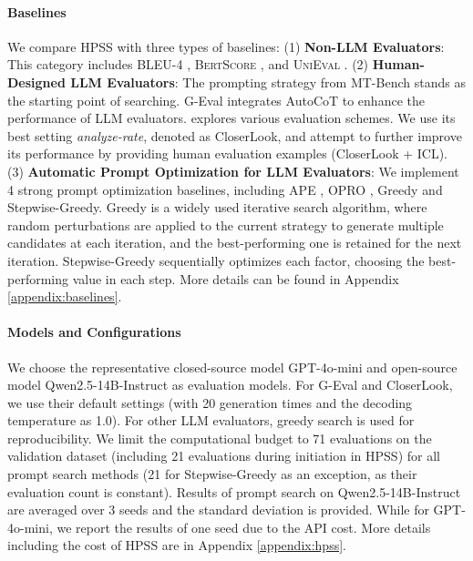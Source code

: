 \paragraph{Baselines}
We compare HPSS with three types of baselines: 
(1) \textbf{Non-LLM Evaluators}: This category includes BLEU-4 \cite{papineni-etal-2002-bleu}, \textsc{BertScore} \cite{bert-score}, 
and \textsc{UniEval} \cite{zhong-etal-2022-towards}.
(2) \textbf{Human-Designed LLM Evaluators}: 
The prompting strategy from MT-Bench \cite{zheng2023judging} 
stands as the starting point of searching.
G-Eval \cite{liu-etal-2023-g} integrates AutoCoT to enhance the performance of LLM evaluators. 
\citet{chiang-lee-2023-closer} explores various evaluation schemes. We use its best setting \textit{analyze-rate}, denoted as CloserLook, and attempt to further improve its performance by providing human evaluation examples (CloserLook + ICL). 
(3) \textbf{Automatic Prompt Optimization for LLM Evaluators}: 
We implement 4 strong prompt optimization baselines, including APE \cite{zhou2023large}, 
OPRO \cite{yang2023large}, 
Greedy \cite{prasad-etal-2023-grips, zhou-etal-2023-survival} and Stepwise-Greedy. 
Greedy is a widely used iterative search algorithm, where random perturbations are applied to the current strategy to generate multiple candidates at each iteration, and the best-performing one is retained for the next iteration. 
Stepwise-Greedy sequentially optimizes each factor, choosing the best-performing value in each step.
More details can be found in Appendix \ref{appendix:baselines}.


\paragraph{Models and Configurations}
We choose the representative closed-source model GPT-4o-mini \cite{openai2023gpt4} and open-source model Qwen2.5-14B-Instruct \cite{qwen2} as evaluation models. 
For G-Eval and CloserLook, we use their default settings (with 20 generation times
and the decoding temperature as 1.0). 
For other LLM evaluators, greedy search is used for reproducibility. 
We limit the computational budget to 71 evaluations on the validation dataset (including 21 evaluations during initiation in HPSS) for all prompt search methods (21 for Stepwise-Greedy as an exception, as their evaluation count is constant). 
Results of prompt search on Qwen2.5-14B-Instruct are averaged over 3 seeds and the standard deviation is provided.
While for GPT-4o-mini, we report the results of one seed due to the API cost.
More details including the cost of HPSS are in Appendix \ref{appendix:hpss}.



